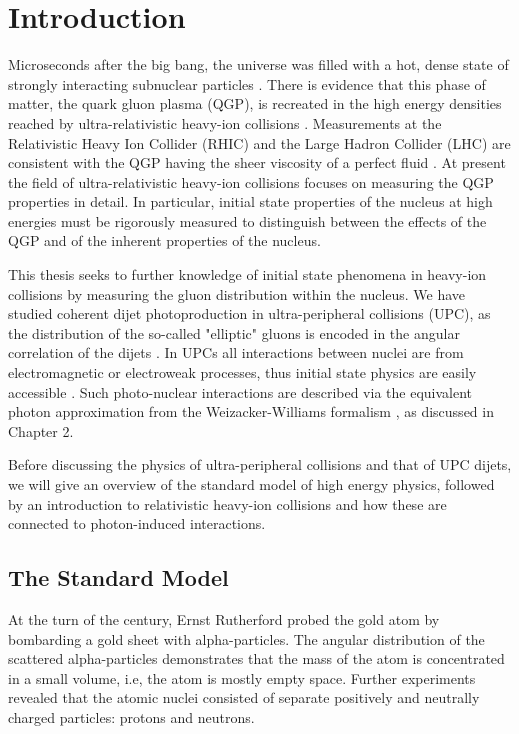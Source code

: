 \setlength\abovedisplayskip{0.4pt}
\setlength\belowdisplayskip{0.4pt}

\chapter{Introduction}

Microseconds after the big bang, the universe was filled with a hot, dense state of strongly interacting subnuclear particles \cite{Rafelski:2013obw}. There is evidence that this phase of matter, the quark gluon plasma (QGP), is recreated in the high energy densities reached by ultra-relativistic heavy-ion collisions \cite{Arsene:2004fa}. Measurements at the Relativistic Heavy Ion Collider (RHIC) and the Large Hadron Collider (LHC) are consistent with the QGP having the sheer viscosity of a perfect fluid \cite{Long:796947}. At present the field of ultra-relativistic heavy-ion collisions focuses on measuring the QGP properties in detail. In particular, initial state properties of the nucleus at high energies must be rigorously measured to distinguish between the effects of the QGP and of the inherent properties of the nucleus.

This thesis seeks to further knowledge of initial state phenomena in heavy-ion collisions by measuring the gluon distribution within the nucleus. We have studied coherent dijet photoproduction in ultra-peripheral collisions (UPC), as the distribution of the so-called "elliptic" gluons is encoded in the angular correlation of the dijets \cite{Hagiwara:2016kam}. In UPCs all interactions between nuclei are from electromagnetic or electroweak processes, thus initial state physics are easily accessible \cite{Contreras:2015dqa}. Such photo-nuclear interactions are described via the equivalent photon approximation from the Weizacker-Williams formalism \cite{vonWeizsacker:1934sx,Williams:1934ad}, as discussed in Chapter 2.

Before discussing the physics of ultra-peripheral collisions and that of UPC dijets, we will give an overview of the standard model of high energy physics, followed by an introduction to relativistic heavy-ion collisions and how these are connected to photon-induced interactions. 

\section{The Standard Model}

At the turn of the century, Ernst Rutherford probed the gold atom by bombarding a gold sheet with alpha-particles. The angular distribution of the scattered alpha-particles demonstrates that the mass of the atom is concentrated in a small volume, i.e, the atom is mostly empty space. Further experiments revealed that the atomic nuclei consisted of separate positively and neutrally charged particles: protons and neutrons. 

